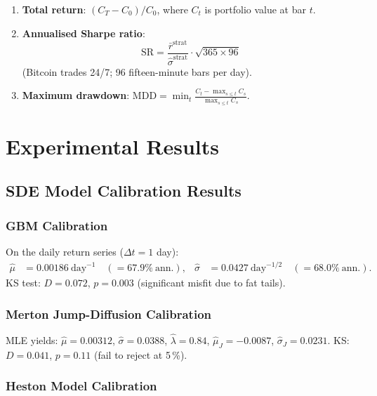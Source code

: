 \documentclass[12pt, a4paper, oneside]{report}
\theoremstyle{plain}
\theoremstyle{definition}
\theoremstyle{remark}
\begin{document}
\begin{enumerate}[leftmargin=1.25cm, label=\arabic*.]
  \item \textbf{Total return}: $(C_T - C_0) / C_0$, where $C_t$ is portfolio
    value at bar $t$.
  \item \textbf{Annualised Sharpe ratio}:
    \[
      \text{SR} = \frac{\bar r^{\text{strat}}}{\hat\sigma^{\text{strat}}}
        \cdot \sqrt{365 \times 96}
    \]
    (Bitcoin trades 24/7; 96 fifteen-minute bars per day).
  \item \textbf{Maximum drawdown}:
    $\text{MDD} = \min_t \frac{C_t - \max_{s \leq t} C_s}{\max_{s \leq t} C_s}$.
\end{enumerate}

\chapter{Experimental Results}
\label{ch:results}

\section{SDE Model Calibration Results}

\subsection{GBM Calibration}

On the daily return series ($\Delta t = 1$ day):
\begin{align*}
  \hat\mu &= 0.00186\ \text{day}^{-1}
    \quad (= 67.9\%\ \text{ann.}), &
  \hat\sigma &= 0.0427\ \text{day}^{-1/2}
    \quad (= 68.0\%\ \text{ann.}).
\end{align*}
KS test: $D = 0.072$, $p = 0.003$ (significant misfit due to fat tails).

\subsection{Merton Jump-Diffusion Calibration}

MLE yields:
$\hat\mu = 0.00312$, $\hat\sigma = 0.0388$, $\hat\lambda = 0.84$,
$\hat\mu_J = -0.0087$, $\hat\sigma_J = 0.0231$.
KS: $D = 0.041$, $p = 0.11$ (fail to reject at 5\,\%).

\subsection{Heston Model Calibration}
\end{document}
